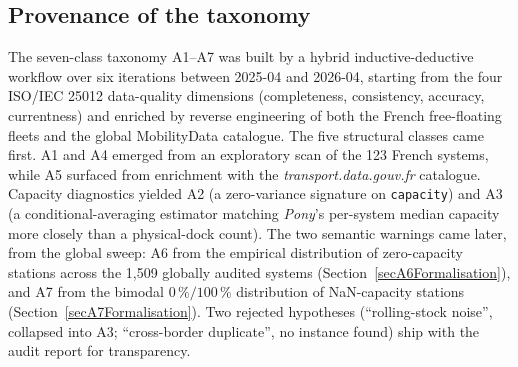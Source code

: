 \documentclass[11pt,a4paper]{article}
\begin{document}
\subsection{Provenance of the taxonomy}
The seven-class taxonomy A1--A7 was built by a hybrid
inductive-deductive workflow over six iterations between 2025-04
and 2026-04, starting from the four ISO/IEC 25012 data-quality
dimensions (completeness, consistency, accuracy, currentness)
and enriched by reverse engineering of both the French
free-floating fleets and the global MobilityData catalogue.
The five structural classes came first. A1 and A4 emerged from an
exploratory scan of the 123 French systems, while A5 surfaced from
enrichment with the \emph{transport.data.gouv.fr} catalogue. Capacity
diagnostics yielded A2 (a zero-variance signature on \texttt{capacity})
and A3 (a conditional-averaging estimator matching \emph{Pony}'s
per-system median capacity more closely than a physical-dock count). The two semantic warnings
came later, from the global sweep: A6 from the empirical
distribution of zero-capacity stations across the 1{,}509 globally
audited systems (Section~\ref{secA6Formalisation}), and A7 from the
bimodal $0\,\%/100\,\%$ distribution of NaN-capacity stations
(Section~\ref{secA7Formalisation}). Two rejected hypotheses
(``rolling-stock noise'', collapsed into A3; ``cross-border
duplicate'', no instance found) ship with the audit report
for transparency.
\end{document}
